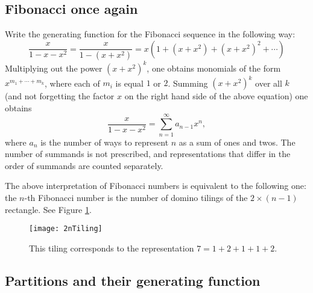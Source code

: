 \subsection{Fibonacci once again}
Write the generating function for the Fibonacci sequence in the following way:
\[
\frac{x}{1-x-x^2} = \frac{x}{1-(x+x^2)} = x( 1 + (x+x^2) + (x+x^2)^2 + \cdots)
\]
Multiplying out the power $(x+x^2)^k$, one obtains monomials of the form $x^{m_1+\cdots+m_k}$,
where each of $m_i$ is equal $1$ or $2$.
Summing $(x+x^2)^k$ over all $k$ (and not forgetting the factor $x$ on the right hand side of the above equation) one obtains
\[
\frac{x}{1-x-x^2} = \sum_{n=1}^\infty a_{n-1} x^n,
\]
where $a_n$ is the number of ways to represent $n$ as a sum of ones and twos.
The number of summands is not prescribed, and representations that differ in the order of summands are counted separately.

The above interpretation of Fibonacci numbers is equivalent to the following one:
the $n$-th Fibonacci number is the number of domino tilings of the $2 \times (n-1)$ rectangle.
See Figure \ref{fig:FibDomino}.

\begin{figure}[ht]
\begin{center}
\texttt{[image: 2nTiling]}
\end{center}
\caption{This tiling corresponds to the representation $7 = 1 + 2 + 1 + 1 + 2$.}
\label{fig:FibDomino}
\end{figure}



\subsection{Partitions and their generating function}
\label{subsec:Partitions}